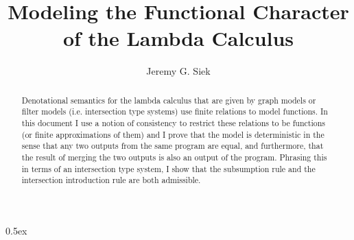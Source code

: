 \documentclass[11pt,a4paper]{article}
\begin{document}
\title{Modeling the Functional Character \\ of the Lambda Calculus}
\author{Jeremy G. Siek}
\maketitle

\begin{abstract}
  Denotational semantics for the lambda calculus that are given by graph models
  or filter models (i.e. intersection type systems) use finite relations
  to model functions. In this document I use a notion of consistency 
  to restrict these relations to be functions (or finite approximations of them) 
  and I prove that the model is deterministic in the sense that any two outputs
  from the same program are equal, and furthermore, that the result of merging
  the two outputs is also an output of the program. Phrasing this in terms
  of an intersection type system, I show that the subsumption rule and the
  intersection introduction rule are both admissible.
\end{abstract}

\tableofcontents

\parindent 0pt\parskip 0.5ex

\pagebreak



%
%
\end{document}
